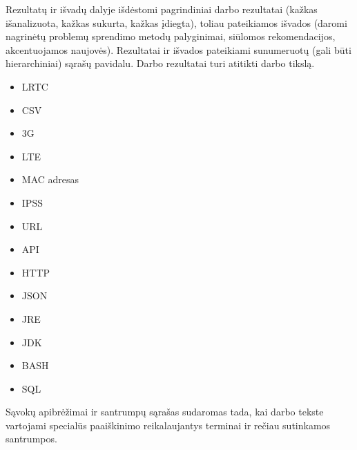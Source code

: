 \documentclass{VUMIFPSbakalaurinis}
\begin{document}
Rezultatų ir išvadų dalyje išdėstomi pagrindiniai darbo rezultatai (kažkas
išanalizuota, kažkas sukurta, kažkas įdiegta), toliau pateikiamos išvados
(daromi nagrinėtų problemų sprendimo metodų palyginimai, siūlomos
rekomendacijos, akcentuojamos naujovės). Rezultatai ir išvados pateikiami
sunumeruotų (gali būti hierarchiniai) sąrašų pavidalu. Darbo rezultatai turi
atitikti darbo tikslą.

\printbibliography[heading=bibintoc]  %

\begin{itemize}
	\item LRTC
	\item CSV
	\item 3G
	\item LTE
	\item MAC adresas
	\item IPSS
	\item URL
	\item API
	\item HTTP
	\item JSON
	\item JRE
	\item JDK
	\item BASH
	\item SQL
\end{itemize}
Sąvokų apibrėžimai ir santrumpų sąrašas sudaromas tada, kai darbo tekste
vartojami specialūs paaiškinimo reikalaujantys terminai ir rečiau sutinkamos
santrumpos.

\appendix  %
\end{document}
